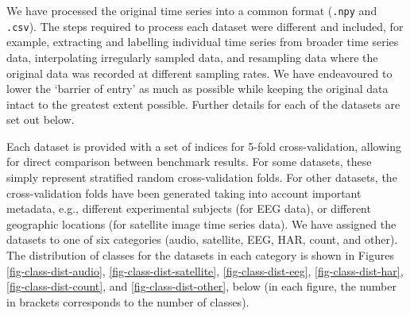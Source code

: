 \documentclass[twoside,11pt,preprint]{article}
\begin{document}
We have processed the original time series into a common format (\texttt{.npy} and \texttt{.csv}). The steps required to process each dataset were different and included, for example, extracting and labelling individual time series from broader time series data, interpolating irregularly sampled data, and resampling data where the original data was recorded at different sampling rates. We have endeavoured to lower the `barrier of entry' as much as possible while keeping the original data intact to the greatest extent possible. Further details for each of the datasets are set out below.

Each dataset is provided with a set of indices for 5-fold cross-validation, allowing for direct comparison between benchmark results. For some datasets, these simply represent stratified random cross-validation folds. For other datasets, the cross-validation folds have been generated taking into account important metadata, e.g., different experimental subjects (for EEG data), or different geographic locations (for satellite image time series data). We have assigned the datasets to one of six categories (audio, satellite, EEG, HAR, count, and other). The distribution of classes for the datasets in each category is shown in Figures \ref{fig-class-dist-audio}, \ref{fig-class-dist-satellite}, \ref{fig-class-dist-eeg}, \ref{fig-class-dist-har}, \ref{fig-class-dist-count}, and \ref{fig-class-dist-other}, below (in each figure, the number in brackets corresponds to the number of classes).
\end{document}
